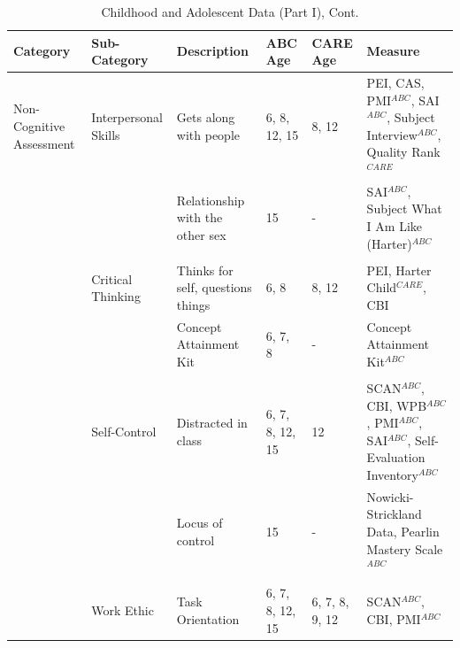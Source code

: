 \documentclass[static]{JJH-Beamer}
\begin{document}
\begin{frame}

\begin{table}[H]
\addtocounter{table}{-1}
\caption{Childhood and Adolescent Data (Part I), Cont.}
\begin{center}
\begin{tiny}
\begin{tabular}{L{1.2cm} C{1.4cm} C{2.3cm} C{1cm} C{1cm} C{2.7cm}}
\toprule
\textbf{Category}	&	\textbf{Sub-Category}	&	\textbf{Description}	&	\textbf{ABC Age}  	&  \textbf{CARE Age}  & 	\textbf{Measure}	\\ \midrule
Non-Cognitive Assessment	&	Interpersonal Skills	&	Gets along with people	&	6, 8, 12, 15	& 	8, 12	&	PEI, CAS, PMI$^{ABC}$, SAI$^{ABC}$, Subject Interview$^{ABC}$, Quality Rank$^{CARE}$	\\
	&		&	Relationship with the other sex	&	15	&	- 	&	 SAI$^{ABC}$, Subject What I Am Like (Harter)$^{ABC}$	\\
	&	\\
	&	Critical Thinking	&	Thinks for self, questions things	&	6, 8	 &	8, 12	&	PEI, Harter Child$^{CARE}$, CBI	\\
	&		&	Concept Attainment Kit	&	6, 7, 8	&	- 	&	Concept Attainment Kit$^{ABC}$	\\
	&	\\
	&	Self-Control	&	Distracted in class	&	6, 7, 8, 12, 15	&	12	&	SCAN$^{ABC}$, CBI, WPB$^{ABC}$, PMI$^{ABC}$, SAI$^{ABC}$, Self-Evaluation Inventory$^{ABC}$	\\
	&		&	Locus of control	&	15	&	- 	&	Nowicki-Strickland Data, Pearlin Mastery Scale$^{ABC}$	\\
	&	\\
	&	Work Ethic	&	Task Orientation	&	6, 7, 8, 12, 15	&	6, 7, 8, 9, 12 	&	SCAN$^{ABC}$, CBI, PMI$^{ABC}$		\\
\bottomrule
\end{tabular}
\end{tiny}
\end{center}
\end{table}

\end{frame}
\end{document}
